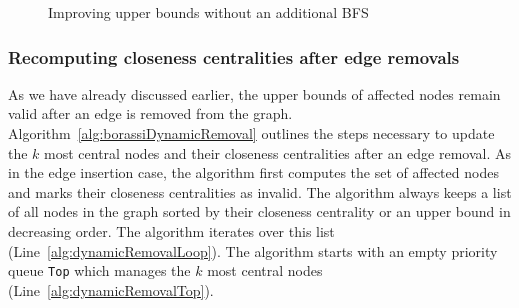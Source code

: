 \begin{figure}[h!]
\centering
{}
\caption{Improving upper bounds without an additional BFS}{}
\label{fig:cheapBoundUpdate}
\end{figure}

\subsubsection{Recomputing closeness centralities after edge removals}
As we have already discussed earlier, the upper bounds of affected nodes remain valid after an edge is removed from the graph. Algorithm~\ref{alg:borassiDynamicRemoval} outlines the steps necessary to update the $k$ most central nodes and their closeness centralities after an edge removal. As in the edge insertion case, the algorithm first computes the set of affected nodes and marks their closeness centralities as invalid. The algorithm always keeps a list of all nodes in the graph sorted by their closeness centrality or an upper bound in decreasing order. The algorithm iterates over this list (Line~\ref{alg:dynamicRemovalLoop}). The algorithm starts with an empty priority queue \texttt{Top} which manages the $k$ most central nodes  (Line~\ref{alg:dynamicRemovalTop}).

